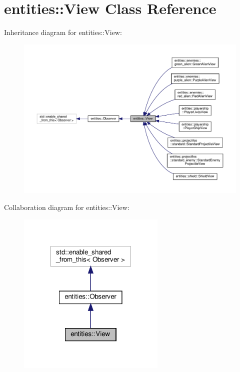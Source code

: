 \hypertarget{classentities_1_1View}{}\section{entities\+:\+:View Class Reference}
\label{classentities_1_1View}


Inheritance diagram for entities\+:\+:View\+:\nopagebreak
\begin{figure}[H]
\begin{center}
\leavevmode
\includegraphics[width=350pt]{classentities_1_1View__inherit__graph}
\end{center}
\end{figure}


Collaboration diagram for entities\+:\+:View\+:\nopagebreak
\begin{figure}[H]
\begin{center}
\leavevmode
\includegraphics[width=200pt]{classentities_1_1View__coll__graph}
\end{center}
\end{figure}
